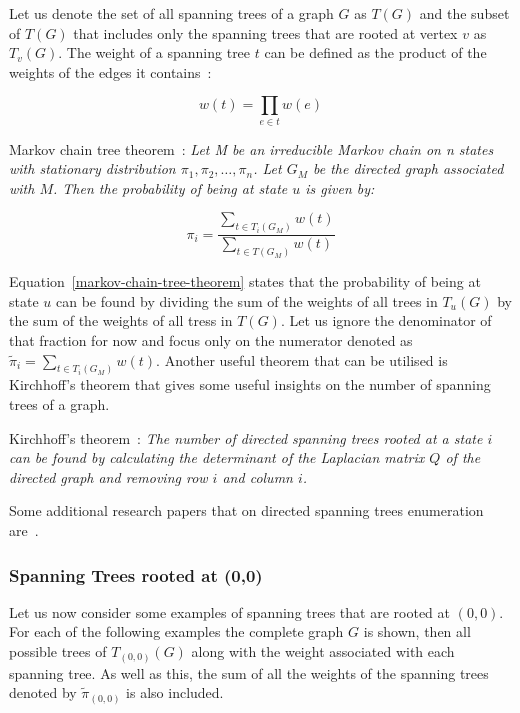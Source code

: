 Let us denote the set of all spanning trees of a graph \(G\) as \(T(G)\)
and the subset of \(T(G)\) that includes only the spanning trees that are rooted
at vertex \(v\) as \(T_v(G)\).
The weight of a spanning tree \(t\) can be defined as the product of the weights
of the edges it contains~\cite{williams2022combinatorics}:

\[
    w(t)=\prod_{e \in t} w(e)
\]


{ Markov chain tree theorem~\cite{broder1989generating}}:
\textit{Let M be an irreducible Markov chain on n states with stationary
distribution \(\pi_1, \pi_2, \dots, \pi_n\).
Let \(G_M\) be the directed graph associated with \(M\).
Then the probability of being at state \(u\) is given by:}

\begin{equation}\label{markov-chain-tree-theorem}
    \pi_i = \frac{\sum_{t \in T_i(G_M)} w(t)}{\sum_{t \in T(G_M)}w(t)}
\end{equation}

Equation~\ref{markov-chain-tree-theorem} states that the probability of being at
state \(u\) can be found by dividing the sum of the weights of all trees in
\(T_u(G)\) by the sum of the weights of all tress in \(T(G)\).
Let us ignore the denominator of that fraction for now and focus only on the
numerator denoted as \(\tilde{\pi}_i=\sum_{t \in T_i(G_M)} w(t)\).
Another useful theorem that can be utilised is Kirchhoff's theorem that gives
some useful insights on the number of spanning trees of a graph.

{ Kirchhoff's theorem~\cite{chaiken1978matrix}}:
\textit{The number of directed spanning trees rooted at a state \(i\) can be
found by calculating the determinant of the Laplacian matrix \(Q\) of the
directed graph and removing row \(i\) and column \(i\).}

Some additional research papers that on directed spanning trees enumeration
are~\cite{yan2011enumeration, sung2016enumeration, uno1996algorithm}.


\subsubsection{Spanning Trees rooted at (0,0)}

Let us now consider some examples of spanning trees that are rooted at
\((0,0)\).
For each of the following examples the complete graph \(G\) is shown, then all
possible trees of \(T_{(0,0)}(G)\) along with the weight associated with each
spanning tree.
As well as this, the sum of all the weights of the spanning trees denoted by
\(\tilde{\pi}_{(0,0)}\) is also included.


